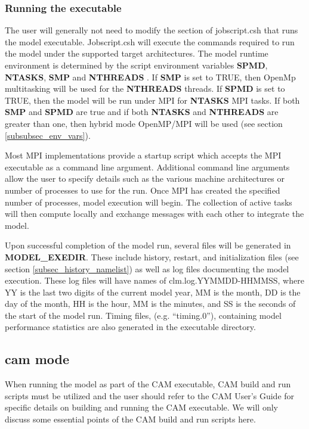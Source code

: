 \subsubsection {Running the executable}

The user will generally not need to modify the section of
jobscript.csh that runs the model executable.  Jobscript.csh will
execute the commands required to run the model under the supported
target architectures.  The model runtime environment is determined by
the script environment variables {\bf SPMD}, {\bf NTASKS}, {\bf SMP}
and {\bf NTHREADS }. If {\bf SMP} is set to TRUE, then OpenMp
multitasking will be used for the {\bf NTHREADS} threads.  If {\bf
SPMD} is set to TRUE, then the model will be run under MPI for {\bf
NTASKS} MPI tasks. If both {\bf SMP} and {\bf SPMD} are true and if
both {\bf NTASKS} and {\bf NTHREADS} are greater than one, then hybrid
mode OpenMP/MPI will be used (see section \ref{subsubsec_env_vars}).

Most MPI implementations provide a startup script which accepts the
MPI executable as a command line argument.  Additional command line
arguments allow the user to specify details such as the various
machine architectures or number of processes to use for the run. Once
MPI has created the specified number of processes, model execution
will begin. The collection of active tasks will then compute locally
and exchange messages with each other to integrate the model.

Upon successful completion of the model run, several files will be
generated in {\bf MODEL\_EXEDIR}. These include history, restart, and
initialization files (see section \ref{subsec_history_namelist}) as
well as log files documenting the model execution. These log files
will have names of clm.log.YYMMDD-HHMMSS, where YY is the last two
digits of the current model year, MM is the month, DD is the day of
the month, HH is the hour, MM is the minutes, and SS is the seconds of
the start of the model run. Timing files, (e.g. ``timing.0''),
containing model performance statistics are also generated in the
executable directory.

\subsection {cam mode}

When running the model as part of the CAM executable, CAM build and
run scripts must be utilized and the user should refer to the CAM
User's Guide for specific details on building and running the CAM
executable. We will only discuss some essential points of the CAM
build and run scripts here.

